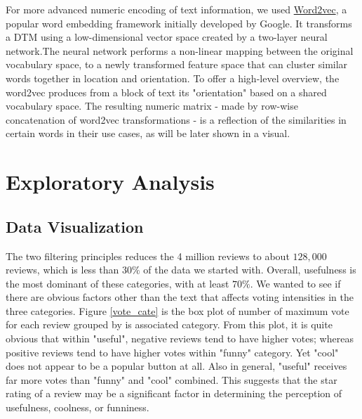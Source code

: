 \documentclass[letterpaper, 12 pt, conference]{ieeeconf}  %
\begin{document}
For more advanced numeric encoding of text information, we used \href{https://en.wikipedia.org/wiki/Word2vec}{Word2vec}, a popular word embedding framework initially developed by Google. It transforms a DTM using a low-dimensional vector space created by a two-layer neural network.The neural network performs a non-linear mapping between the original vocabulary space, to a newly transformed feature space that can cluster similar words together in location and orientation. To offer a high-level overview, the word2vec produces from a block of text its "orientation" based on a shared vocabulary space. The resulting numeric matrix - made by row-wise concatenation of word2vec transformations - is a reflection of the similarities in certain words in their use cases, as will be later shown in a visual.

\section{Exploratory Analysis}

\subsection{Data Visualization}

The two filtering principles reduces the 4 million reviews to about $128,000$ reviews, which is less than $30\%$ of the data we started with. Overall, usefulness is the most dominant of these categories, with at least $70\%$. We wanted to see if there are obvious factors other than the text that affects voting intensities in the three categories. Figure \ref{vote_cate} is the box plot of number of maximum vote for each review grouped by is associated category. From this plot, it is quite obvious that within "useful", negative reviews tend to have higher votes; whereas positive reviews tend to have higher votes within "funny" category. Yet "cool" does not appear to be a popular button at all. Also in general, "useful" receives far more votes than "funny" and "cool" combined. This suggests that the star rating of a review may be a significant factor in determining the perception of usefulness, coolness, or funniness.
\end{document}
